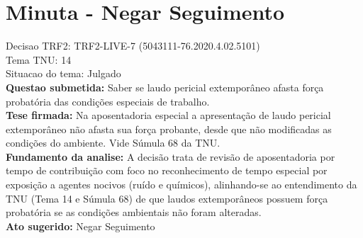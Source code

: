 \documentclass{article}
\begin{document}
\section*{Minuta - Negar Seguimento}
Decisao TRF2: TRF2-LIVE-7 (5043111-76.2020.4.02.5101)\\
Tema TNU: 14\\
Situacao do tema: Julgado\\
\textbf{Questao submetida:} Saber se laudo pericial extemporâneo afasta força probatória das condições especiais de trabalho.\\
\textbf{Tese firmada:} Na aposentadoria especial a apresentação de laudo pericial extemporâneo não afasta sua força probante, desde que não modificadas as condições do ambiente. Vide Súmula 68 da TNU.\\
\textbf{Fundamento da analise:} A decisão trata de revisão de aposentadoria por tempo de contribuição com foco no reconhecimento de tempo especial por exposição a agentes nocivos (ruído e químicos), alinhando-se ao entendimento da TNU (Tema 14 e Súmula 68) de que laudos extemporâneos possuem força probatória se as condições ambientais não foram alteradas.\\
\textbf{Ato sugerido:} Negar Seguimento
\end{document}
